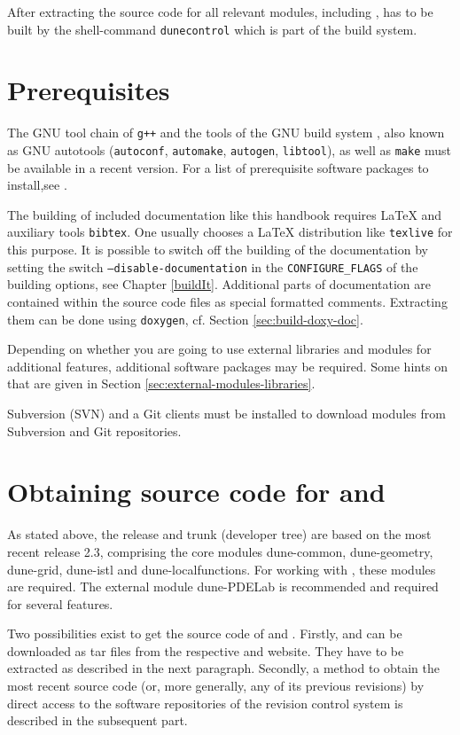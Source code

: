 After extracting the source code for all relevant \Dune modules, including \Dumux, \Dune has to be built
by the shell-command \texttt{dunecontrol} which is part of the \Dune build system.

\section{Prerequisites} \label{sec:prerequisites}
The GNU tool chain of \texttt{g++}  and the tools of the GNU build system \cite{GNU-BS}, also known as GNU autotools
(\texttt{autoconf}, \texttt{automake}, \texttt{autogen}, \texttt{libtool}), as well as \texttt{make}
must be available in a recent version. For a list of prerequisite software packages to install,see
\cite{DUNE-WIKI-PREREQUISITE-SOFTWARE}.

The building of included documentation like this handbook requires \LaTeX{} and auxiliary tools
\texttt{bibtex}. One usually chooses a \LaTeX{} distribution like \texttt{texlive} for this purpose.
It is possible to switch off the building of the documentation by setting the switch \texttt{--disable-documentation} 
in the \texttt{CONFIGURE\_FLAGS} of the building options, see Chapter \ref{buildIt}.
Additional parts of documentation are contained within the source code files as special formatted comments.
Extracting them can be done using \texttt{doxygen}, cf. Section \ref{sec:build-doxy-doc}.

Depending on whether you are going to use external libraries and modules for additional \Dune features, 
additional software packages may be required. Some hints on that are given in Section \ref{sec:external-modules-libraries}.

Subversion (SVN) and a Git clients must be installed to download modules from Subversion and Git repositories.

\section{Obtaining source code for \Dune and \Dumux}
As stated above, the \Dumux release and trunk (developer tree) are based on the most recent
\Dune release 2.3, comprising the core modules dune-common, dune-geometry, dune-grid,
dune-istl and dune-localfunctions. For working with \Dumux, these modules are required. The
external module dune-PDELab is recommended and required for several \Dumux features.

Two possibilities exist to get the source code of \Dune and \Dumux.
Firstly, \Dune and \Dumux can be downloaded as tar files from the respective \Dune and \Dumux website.
They have to be extracted as described in the next paragraph.
Secondly, a method to obtain the most recent source code (or, more generally, any of its previous revisions) by direct access 
to the software repositories of the revision control system is described in the subsequent part. 

